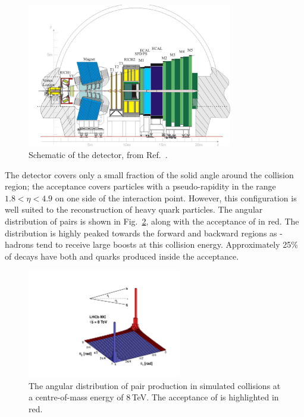 \begin{figure}[!h]
    \centering
    \includegraphics[width=0.8\textwidth]{figs/Detector/LHCb_Detector_Schematic.pdf}
    \caption{Schematic of the \lhcb detector, from Ref.~\cite{Alves:2008zz}.}
    \label{fig:Dec_lhcb_Schematic}   
\end{figure}

The \lhcb detector covers only a small fraction of the solid angle around the collision region; the acceptance covers particles with a pseudo-rapidity in the range $1.8 < \eta < 4.9$ on one side of the interaction point. However, this configuration is well suited to the reconstruction of heavy quark particles. The angular distribution of \bquark\bquarkbar pairs is shown in Fig.~\ref{fig:Dec_bb_production}, along with the acceptance of \lhcb in red. The distribution is highly peaked towards the forward and backward regions as \bquark-hadrons tend to receive large boosts at this collision energy. Approximately 25\% of decays have both \bquark and \bquarkbar quarks produced inside the acceptance.

\begin{figure}[!h]
    \centering
    \includegraphics[width=0.6\textwidth]{figs/Detector/bb_acceptance.pdf}
    \caption{The angular distribution of \bquark\bquarkbar pair production in simulated \proton \proton collisions at a centre-of-mass energy of 8\,TeV. The acceptance of \lhcb is highlighted in red.}
    \label{fig:Dec_bb_production}   
\end{figure}


